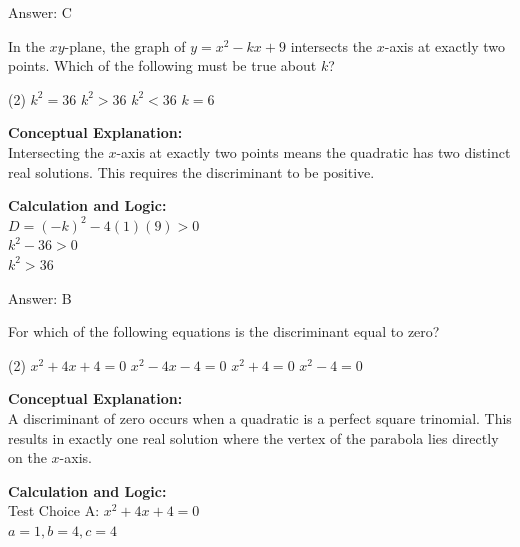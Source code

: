 \documentclass[11pt,paper=a4,answers]{exam}
\begin{document}
\begin{questions}
\begin{solution}
Answer: \colorbox{yellow!100}{C}
\end{solution}

\vspace{40pt}

\question
In the $xy$-plane, the graph of $y = x^2 - kx + 9$ intersects the $x$-axis at exactly two points. Which of the following must be true about $k$?
\begin{tasks}(2)
    \task $k^2 = 36$
    \task $k^2 > 36$
    \task $k^2 < 36$
    \task $k = 6$
\end{tasks}

\begin{solution}
\textbf{Conceptual Explanation:} \\
Intersecting the $x$-axis at exactly two points means the quadratic has two distinct real solutions. This requires the discriminant to be positive.

\vspace{20pt}

\textbf{Calculation and Logic:} \\
$D = (-k)^2 - 4(1)(9) > 0$ \\
$k^2 - 36 > 0$ \\
$k^2 > 36$

\vspace{25pt}

Answer: \colorbox{yellow!100}{B}
\end{solution}


\question
For which of the following equations is the discriminant equal to zero?
\begin{tasks}(2)
    \task $x^2 + 4x + 4 = 0$
    \task $x^2 - 4x - 4 = 0$
    \task $x^2 + 4 = 0$
    \task $x^2 - 4 = 0$
\end{tasks}

\begin{solution}
\textbf{Conceptual Explanation:} \\
A discriminant of zero occurs when a quadratic is a perfect square trinomial. This results in exactly one real solution where the vertex of the parabola lies directly on the $x$-axis.

\vspace{20pt}

\textbf{Calculation and Logic:} \\
Test Choice A: $x^2 + 4x + 4 = 0$ \\
$a = 1, b = 4, c = 4$


\end{solution}
\end{questions}
\end{document}
